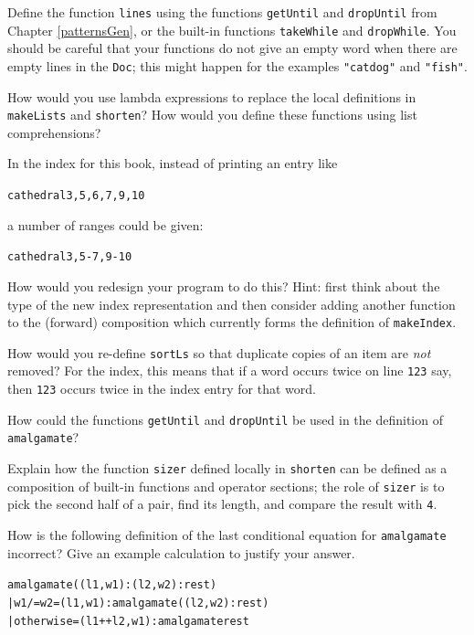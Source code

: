 \begin{exercises}


\item
Define the function \texttt{lines} using the functions \texttt{getUntil} and 
\texttt{dropUntil} from Chapter \ref{patternsGen}, or the built-in functions \texttt{takeWhile}
and \texttt{dropWhile}. You should be careful that your functions do not give an
empty word when there are empty lines in the \texttt{Doc}; this might happen for the
examples \texttt{"catdog"} and \texttt{"fish"}.

\item
How would you use lambda expressions to replace the local definitions in
\texttt{makeLists} and \texttt{shorten}? How would you define these
functions using list comprehensions?

\item
In the index for this book, instead of printing an entry like
\begin{alltt}
cathedral        3, 5, 6, 7, 9, 10
\end{alltt}
a number of ranges could be given:
\begin{alltt}
cathedral        3, 5-7, 9-10
\end{alltt}
How would you redesign your program to do this? Hint: first think about the type
of the new index representation and then consider adding
another function to the (forward) composition which currently forms the
definition of \texttt{makeIndex}.


\item 
How would you re-define \texttt{sortLs} so that duplicate copies of an item are
{\em not\/} removed? For the index, this means that if a word occurs twice on line
\texttt{123} say, then \texttt{123} occurs twice in the index entry for that word.

\item
How could the functions \texttt{getUntil} and \texttt{dropUntil} be used in the
definition of \texttt{amalgamate}?

\item
Explain how the function \texttt{sizer} defined locally in \texttt{shorten}
can be defined as a composition of
built-in functions and operator sections; the role of \texttt{sizer} is
to pick the second half of a pair, find its length, and compare the result
with \texttt{4}.

\item
How is the following definition of the last conditional
equation for \texttt{amalgamate}
incorrect? Give an example calculation to justify your answer.
\begin{alltt}
amalgamate ((l1,w1):(l2,w2):rest)
  | w1 /= w2    = (l1,w1) : amalgamate ((l2,w2):rest)
  | otherwise   = (l1++l2,w1) : amalgamate rest
\end{alltt}


\end{exercises}
